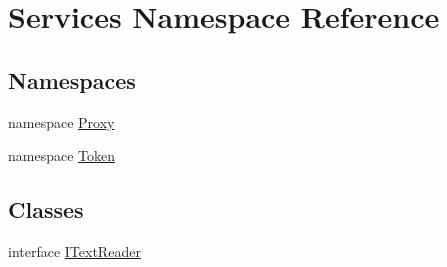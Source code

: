 \hypertarget{namespace_services}{}\section{Services Namespace Reference}
\label{namespace_services}
\subsection*{Namespaces}
\begin{DoxyCompactItemize}
\item 
namespace \hyperlink{namespace_services_1_1_proxy}{Proxy}
\item 
namespace \hyperlink{namespace_services_1_1_token}{Token}
\end{DoxyCompactItemize}
\subsection*{Classes}
\begin{DoxyCompactItemize}
\item 
interface \hyperlink{interface_services_1_1_i_text_reader}{I\+Text\+Reader}
\end{DoxyCompactItemize}
